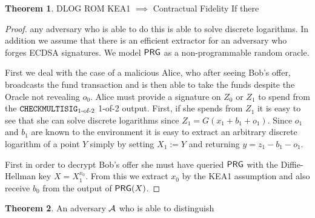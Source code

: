 \documentclass{article}
\theoremstyle{definition}
\newtheorem{theorem}{Theorem}[section]
\begin{document}
  \begin{theorem}{DLOG ROM KEA1 $\implies$ Contractual Fidelity}
    If there
  \end{theorem}

  \begin{proof}
    any adversary who is able to do this is able to solve discrete logarithms. In addition we assume that there is an efficient extractor for an adversary who forges ECDSA signatures. We model $\textsf{PRG}$ as a non-programmable random oracle.

First we deal with the case of a malicious Alice, who after seeing Bob's offer, broadcasts the fund transaction and is then able to take the funds despite the Oracle not revealing $o_0$. Alice must provide a signature on $Z_0$ or $Z_1$ to spend from the $\texttt{CHECKMULTISIG}_{\text{1-of-2}}$ 1-of-2 output. First, if she spends from $Z_1$ it is easy to see that she can solve discrete logarithms since $Z_1 = G(x_1 + b_1 + o_1)$. Since $o_1$ and $b_1$ are known to the environment it is easy to extract an arbitrary discrete logarithm of a point $Y$ simply by setting $X_1 := Y$ and returning $y = z_1 - b_1 - o_1$.

First in order to decrypt Bob's offer she must have queried $\textsf{PRG}$ with the Diffie-Hellman key $X = X_1^{x_0}$. From this we extract $x_0$ by the KEA1 assumption and also receive $b_0$ from the output of $\textsf{PRG}(X)$.

\end{proof}

\begin{theorem}
  An adversary $\mathcal{A}$ who is able to distinguish
\end{theorem}





\end{document}
